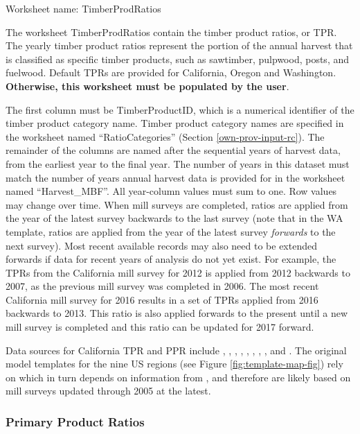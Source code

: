 \documentclass[
  openany]{book}
\begin{document}
Worksheet name: TimberProdRatios

The worksheet TimberProdRatios contain the timber product ratios, or TPR. The yearly timber product ratios represent the portion of the annual harvest that is classified as specific timber products, such as sawtimber, pulpwood, posts, and fuelwood. Default TPRs are provided for California, Oregon and Washington. \textbf{Otherwise, this worksheet must be populated by the user}.

The first column must be TimberProductID, which is a numerical identifier of the timber product category name. Timber product category names are specified in the worksheet named ``RatioCategories'' (Section \ref{own-prov-input-rc}). The remainder of the columns are named after the sequential years of harvest data, from the earliest year to the final year. The number of years in this dataset must match the number of years annual harvest data is provided for in the worksheet named ``Harvest\_MBF''. All year-column values must sum to one. Row values may change over time. When mill surveys are completed, ratios are applied from the year of the latest survey backwards to the last survey (note that in the WA template, ratios are applied from the year of the latest survey \emph{forwards} to the next survey). Most recent available records may also need to be extended forwards if data for recent years of analysis do not yet exist. For example, the TPRs from the California mill survey for 2012 is applied from 2012 backwards to 2007, as the previous mill survey was completed in 2006. The most recent California mill survey for 2016 results in a set of TPRs applied from 2016 backwards to 2013. This ratio is also applied forwards to the present until a new mill survey is completed and this ratio can be updated for 2017 forward.

Data sources for California TPR and PPR include \textcite{barrette1970}, \textcite{hiserote1978}, \textcite{howard1974}, \textcite{marcille2020}, \textcite{mciver2015}, \textcite{morgan2004}, \textcite{morgan2012}, \textcite{ward1995}, and \textcite{ward1997}. The original model templates for the nine US regions (see Figure \ref{fig:template-map-fig}) rely on \textcite{smith2006} which in turn depends on information from \textcite{adams2006}, and therefore are likely based on mill surveys updated through 2005 at the latest.

\hypertarget{own-prov-input-ppr}{%
\subsubsection{Primary Product Ratios}\label{own-prov-input-ppr}}
\end{document}
